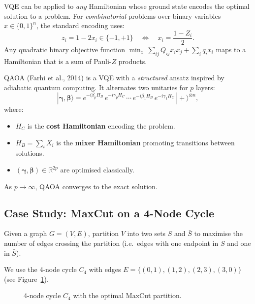 \documentclass[a4paper,11pt]{article}
\newcommand{\crd}[1]{\textcolor{ibmred}{#1}}
\newcommand{\cblu}[1]{\textcolor{ibmblue}{#1}}
\newcommand{\ket}[1]{|#1\rangle}
\begin{document}
VQE can be applied to \emph{any} Hamiltonian whose ground state encodes the
optimal solution to a problem. For \emph{combinatorial} problems over binary
variables $x \in \{0,1\}^n$, the standard encoding uses:
\begin{equation}
    z_i = 1 - 2x_i \in \{-1,+1\} \quad\Longleftrightarrow\quad
    x_i = \frac{1-Z_i}{2}.
\end{equation}
Any quadratic binary objective function
$\min_x\,\sum_{ij} Q_{ij} x_i x_j + \sum_i q_i x_i$
maps to a Hamiltonian that is a sum of Pauli-$Z$ products.

QAOA (Farhi et al., 2014) is a VQE with a \emph{structured} ansatz inspired
by adiabatic quantum computing. It alternates two unitaries for $p$ layers:
\begin{equation}
    \ket{\boldsymbol\gamma,\boldsymbol\beta}
    = e^{-i\beta_p H_B}\,e^{-i\gamma_p H_C}\,\cdots\,
      e^{-i\beta_1 H_B}\,e^{-i\gamma_1 H_C}\,\ket{+}^{\otimes n},
\end{equation}
where:
\begin{itemize}
    \item $H_C$ is the \textbf{cost Hamiltonian} encoding the problem.
    \item $H_B = \sum_i X_i$ is the \textbf{mixer Hamiltonian} promoting
          transitions between solutions.
    \item $(\boldsymbol\gamma, \boldsymbol\beta) \in \mathbb{R}^{2p}$ are
          optimised classically.
\end{itemize}
As $p \to \infty$, QAOA converges to the exact solution.

\subsection{Case Study: MaxCut on a 4-Node Cycle}

\begin{defbox}[MaxCut]
Given a graph $G = (V, E)$, partition $V$ into two sets $S$ and $\bar{S}$
to maximise the number of edges crossing the partition
(i.e.\ edges with one endpoint in $S$ and one in $\bar{S}$).
\end{defbox}

\noindent We use the 4-node cycle $C_4$ with edges
$E = \{(0,1),(1,2),(2,3),(3,0)\}$ (see Figure~\ref{fig:cycle}).

\begin{figure}[H]
\centering
{}
\caption{4-node cycle $C_4$ with the optimal MaxCut partition.}
\label{fig:cycle}
\end{figure}
\end{document}
